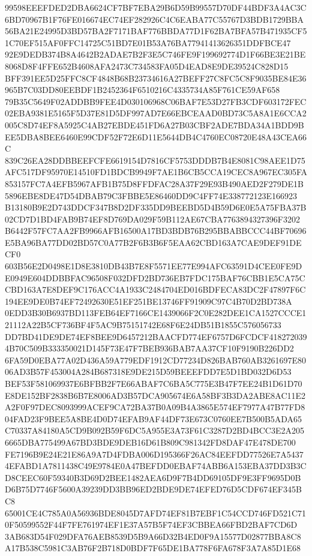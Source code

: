 \documentclass[UTF8,fontset=fandol,zihao=-4,a4paper]{ctexart}
\begin{document}
{{99598EEEFDED2DBA6624CF7BF7EBA29B6D59B99557D70DF44BDF3A4AC3C6BD70967B1F76FE016674EC74EF282926C4C6EABA77C55767D3BDB1729BBA
56BA21E24995D3BD57BA2F7171BAF776BBDA77D1F62BA7BFA57B471935CF51C70EF515AF0FFC14725C51BD7E01B53A76BA77941413626351DDFBCE47
92E9DEDB374B8A4642B2ADAE7B2F3E5C746FE9F199692774D1F66BE3E21BE8068D8F4FFE652B4608AFA2473C734583FA05D4EAD8E9DE39524C828D15
BFF391EE5D25FFC8CF4848B68B23734616A27BEFF27C8FC5C8F9035BE84E36965B7C03DD80EEBDF1B2452364F6510216C4335734A85F761CE59AF658
79B35C5649F02ADDBB9FEE4D030106968C06BAF7E53D27FB3CDF603172FEC02EBA9381E5165F5D37E81D5DF997AD7E66EBCEAAD0BD73C5A8A1E6CCA2
005C8D74EF8A5925C4AB27EBDE451FD6A27B03CBF2ADE7BDA34A1BDD9BEE5DBA8BEE6460E99CDF52F72E6D11E5644DB4C4760EC08720E48A43CEA66C
839C26EA28DDBBEEFCFE6619154D7816CF5753DDDB7B4E8081C98AEE1D75AFC517DF95970E14510FD1BDCB9949F7AE1B6CB5CCA19CEC8A967EC305FA
853157FC7A4EFB5967AFB1B75D8FFDFAC28A37F29E93B490AED2F279DE1B5896EBE8DE47D54DBAB79C3FBBE5E86460DD9C4FF74E338772123E166923
B13180B9E2D743DDCF347B8D2DF335DD9BEEBD5D4B59D6E0E5A75FBA37B02CD7D1BD4FAB9B74EF8D769DA029F59B112AE67CBA7763894327396F3202
B6442F57FC7AA2FB9966AFB16500A17BD3BDB76B295BBABBCCC44BF70696E5BA96BA77DD02BD57C0A77B2F6B3B6F5EAA62CBD163A7CAE9DEF91DECF0
603B56E2D0498E1D8E3810DB43B7E8F5571EE77E994AFC63591D4CEE0FE9DE0949E604DDBBFAC96508F032DFD2BD736EB7FDC175BAF76CBB1E5CA75C
CBD163A7E8DEF9C176ACC4A1933C2484704ED016BDFECA83DC2F47897F6C194EE9DE0B74EF72492630E51EF251BE13746FF91909C97C4B70D2BD738A
0EDD3B30B6937BD113FEB64EF7166CE1439066F2C0E282DEE1CA1527CCCE121112A22B5CF736BF4F5AC9B75151742E68F6E24DB51B1855C576056733
DD7BD41DE9DE74EF8BEE9D6457212BAACFD774EF6757D6FCDCF4182720394B70C509B333350021D145F73E47F7BEB936BAB7AA37CF10F9190B226DD2
6FA59D0EBA77A02D436A59A779EDF1912CD77234D826BAB760AB3261697E8006AD3B57F453004A284B687318E9DE215D59BEEEFDD7E5D1BD032D6D53
BEF53F581069937E6BFBB2F7E66ABAF7C6BA5C775E3B47F7EE24B1D61D70E8DE152BF2838B6B7E8006AD3B57DCA905674E6A58BF3B3DA2ABE8AC11E2
A2F0F97DEC8093999ACEF9CA72BA37B0A09B4A3865E574EF7977A47B77FD804FAD23F9BEE5A8BE4D0D74EFAB9AF44DF73E673C0760EE7B500B5ADA65
C70337A84180A5CD9B092B59F6DC5A955E3A73F61C3287D2BD4BCC3E2A2056665DBA775499A67BD3BDE9DEB16D61B809C981342FD8DAF47E478DE700
FE7196B9E24E21E86A9A7D4FDBA006D195366F26AC84EEFDD77526E7A54374EFABD1A7811438C49E9784E0A47BEFDD0EBAF74ABB6A153EBA37DD3B3C
D8CEEC60F59340B3D69D2BEE1482AEA6D9F7B4DD69105DF9E3FF9695D0BD6B75D7746F5600A39239DD3BB96ED2BDE9DE74EFED76D5CDF674EF345BC8
65001CE4C785A0A56936BDE8045D7AFD74EF81B7EBF1C54CCD746FD521C710F50599552F44F7FE761974EF1E37A57B5F74EF3CBBEA66FBD2BAF7CD6D
3AB683D54F029DFA76AEB8539D5B9A66D32B4ED0F9A15577D02877BBA8C8A17B538C5981C3AB76F2B718D0BDF7F65DE1BA778F6FA678F3A7A85D1E68
}}
\end{document}
